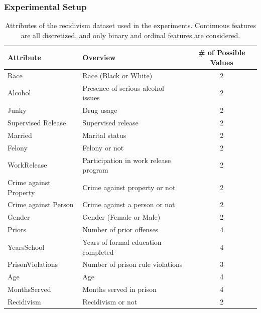 \documentclass[runningheads]{llncs}
\begin{document}
{\subsubsection{Experimental Setup}\label{sec:exp-setting}
{%
  \renewcommand{\arraystretch}{1.05}
  \begin{table}[tbp]
    \centering
    \caption[Attributes of the recidivism dataset used in the experiments]{%
      Attributes of the recidivism dataset used in the experiments.
      Continuous features are all discretized,
      and only binary and ordinal features are considered.
    }\label{tab:rcdv}
    \begin{tabular}{llc}
      \toprule
      Attribute              & Overview                              & \# of Possible Values \\
      \midrule
      Race                   & Race (Black or White)                 & 2                     \\
      Alcohol                & Presence of serious alcohol issues    & 2                     \\
      Junky                  & Drug usage                            & 2                     \\
      Supervised Release     & Supervised release                    & 2                     \\
      Married                & Marital status                        & 2                     \\
      Felony                 & Felony or not                         & 2                     \\
      WorkRelease            & Participation in work release program & 2                     \\
      Crime against Property & Crime against property or not         & 2                     \\
      Crime against Person   & Crime against a person or not         & 2                     \\
      Gender                 & Gender (Female or Male)               & 2                     \\
      Priors                 & Number of prior offenses              & 4                     \\
      YearsSchool            & Years of formal education completed   & 4                     \\
      PrisonViolations       & Number of prison rule violations      & 3                     \\
      Age                    & Age                                   & 4                     \\
      MonthsServed           & Months served in prison               & 4                     \\
      \midrule
      Recidivism             & Recidivism or not                     & 2                     \\
      \bottomrule
    \end{tabular}
  \end{table}
}

}
\end{document}
